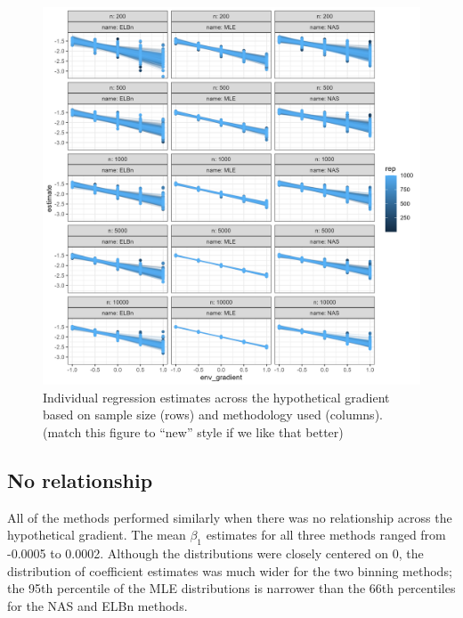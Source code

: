 \documentclass[
]{article}
\begin{document}
\begin{figure}
\centering
\includegraphics{figures/n_vary_main.png}
\caption{Individual regression estimates across the hypothetical
gradient based on sample size (rows) and methodology used (columns).
(match this figure to ``new'' style if we like that better)}
\end{figure}

\newpage

\hypertarget{no-relationship-1}{%
\subsection{No relationship}\label{no-relationship-1}}

All of the methods performed similarly when there was no relationship
across the hypothetical gradient. The mean \(\beta_1\) estimates for all
three methods ranged from -0.0005 to 0.0002. Although the distributions
were closely centered on 0, the distribution of coefficient estimates
was much wider for the two binning methods; the 95th percentile of the
MLE distributions is narrower than the 66th percentiles for the NAS and
ELBn methods.
\end{document}
